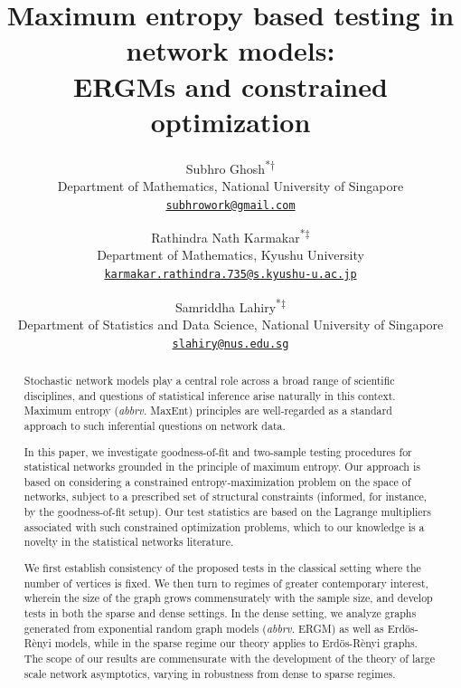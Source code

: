 \documentclass[12pt]{article}
\title{\textbf{Maximum entropy based testing in network models: \\ ERGMs and constrained optimization}}
\author{
Subhro Ghosh\textsuperscript{*}\textsuperscript{$\dagger$}\\
Department of Mathematics, National University of Singapore\\
\href{mailto:matghos@nus.edu.sg}{\texttt{subhrowork@gmail.com}}
\and
Rathindra Nath Karmakar\textsuperscript{*}\textsuperscript{$\ddagger$}\\
Department of Mathematics, Kyushu University\\
\href{mailto:karmakar.rathindra.735@s.kyushu-u.ac.jp}{\texttt{karmakar.rathindra.735@s.kyushu-u.ac.jp}}
\and
Samriddha Lahiry\textsuperscript{*}\textsuperscript{$\ddagger$}\\
Department of Statistics and Data Science, National University of Singapore\\
\href{mailto:slahiry@nus.edu.sg}{\texttt{slahiry@nus.edu.sg}}
}
\date{}
\def\er{ Erd{\"o}s-R{\`e}nyi }
\numberwithin{equation}{section}
\begin{document}
\renewcommand\Authands{ and }

\maketitle

\begingroup
\renewcommand{\thefootnote}{\fnsymbol{footnote}}
\setcounter{footnote}{0}
\endgroup

\begin{abstract}
Stochastic network models play a central role across a broad range of scientific disciplines, and questions of statistical inference arise naturally in this context. Maximum entropy ({\it abbrv.} MaxEnt) principles are well-regarded as a standard approach to such inferential questions on network data.  

In this paper, we investigate goodness-of-fit and two-sample testing procedures for statistical networks grounded in the principle of maximum entropy. Our approach is based on considering a constrained entropy-maximization problem on the space of networks, subject to a prescribed set of structural constraints (informed, for instance, by the goodness-of-fit setup). Our test statistics are based on the Lagrange multipliers associated with such constrained optimization problems, which to our knowledge is a novelty in the statistical networks literature.

We first establish consistency of the proposed tests in the classical setting where the number of vertices is fixed. We then turn to regimes of greater contemporary interest, wherein the size of the graph grows commensurately with the sample size, and develop tests in both the sparse and dense settings. In the dense setting, we analyze graphs generated from exponential random graph models ({\it abbrv.} ERGM)  as well as \er models, while in the sparse regime our theory applies to \er graphs. The scope of our results are commensurate with the development of the theory of large scale network asymptotics, varying in robustness from dense to sparse regimes.


\end{abstract}
\end{document}
